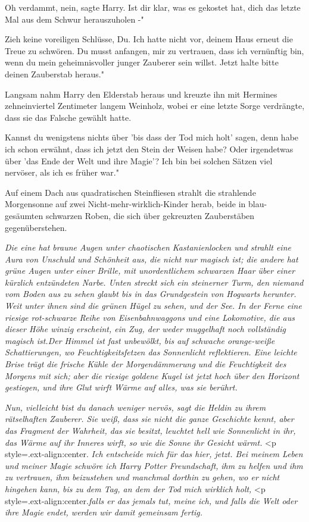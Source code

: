 \glqq{}Oh verdammt, nein\grqq{}, sagte Harry. \glqq{}Ist dir klar, was es gekostet
hat, dich das letzte Mal aus dem Schwur herauszuholen -"

\glqq{}Zieh keine voreiligen Schlüsse, Du. Ich hatte nicht vor, deinem Haus
erneut die Treue zu schwören. Du musst anfangen, mir zu vertrauen, dass ich
vernünftig bin, wenn du mein geheimnisvoller junger Zauberer sein willst. Jetzt
halte bitte deinen Zauberstab heraus."

Langsam nahm Harry den Elderstab heraus und kreuzte ihn mit Hermines
zehneinviertel Zentimeter langem Weinholz, wobei er eine letzte Sorge
verdrängte, dass sie das Falsche gewählt hatte.

\glqq{}Kannst du wenigstens nichts über 'bis dass der Tod mich holt' sagen, denn
habe ich schon erwähnt, dass ich jetzt den Stein der Weisen habe? Oder
irgendetwas über 'das Ende der Welt und ihre Magie'? Ich bin bei solchen Sätzen
viel nervöser, als ich es früher war."

Auf einem Dach aus quadratischen Steinfliesen strahlt die strahlende Morgensonne
auf zwei Nicht-mehr-wirklich-Kinder herab, beide in blau-gesäumten schwarzen
Roben, die sich über gekreuzten Zauberstäben gegenüberstehen.

\emph{Die eine hat braune Augen unter chaotischen Kastanienlocken und strahlt
eine Aura von Unschuld und Schönheit aus, die nicht nur magisch ist; die andere
hat grüne Augen unter einer Brille, mit unordentlichem schwarzen Haar über einer
kürzlich entzündeten Narbe. Unten streckt sich ein steinerner Turm, den niemand
vom Boden aus zu sehen glaubt bis in das Grundgestein von Hogwarts herunter.
Weit unter ihnen sind die grünen Hügel zu sehen, und der See. In der Ferne eine
riesige rot-schwarze Reihe von Eisenbahnwaggons und eine Lokomotive, die aus
dieser Höhe winzig erscheint, ein Zug, der weder muggelhaft noch vollständig
magisch ist.Der Himmel ist fast unbewölkt, bis auf schwache orange-weiße
Schattierungen, wo Feuchtigkeitsfetzen das Sonnenlicht reflektieren. Eine
leichte Brise trägt die frische Kühle der Morgendämmerung und die Feuchtigkeit
des Morgens mit sich; aber die riesige goldene Kugel ist jetzt hoch über den
Horizont gestiegen, und ihre Glut wirft Wärme auf alles, was sie berührt.}

\emph{\glqq{}Nun, vielleicht bist du danach weniger nervös\grqq{}, sagt die
Heldin zu ihrem rätselhaften Zauberer. Sie weiß, dass sie nicht die ganze
Geschichte kennt, aber das Fragment der Wahrheit, das sie besitzt, leuchtet hell
wie Sonnenlicht in ihr, das Wärme auf ihr Inneres wirft, so wie die Sonne ihr
Gesicht wärmt.}    <p
style=\grqq{}.ext-align:center\grqq{}.\emph{ \glqq{}Ich entscheide mich für das
hier, jetzt. Bei meinem Leben und meiner Magie schwöre ich Harry Potter
Freundschaft,}    \emph{ihm zu helfen
und ihm zu vertrauen, ihm beizustehen und manchmal dorthin zu gehen, wo er nicht
hingehen kann,}    \emph{bis zu dem
Tag, an dem der Tod mich wirklich holt,}   <p
style=\grqq{}.ext-align:center\grqq{}.\emph{falls er das jemals tut, meine ich,
}   \emph{und falls die Welt oder
ihre Magie endet, werden wir damit gemeinsam fertig.\grqq{}}

